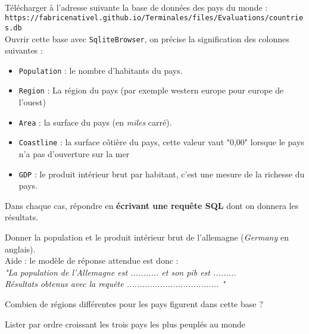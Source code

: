 \documentclass[11pt,a4paper]{article}
\begin{document}
\\
Télécharger à l'adresse suivante la base de données des pays du monde : \\
{\tt https://fabricenativel.github.io/Terminales/files/Evaluations/countries.db} \\
Ouvrir cette base avec {\tt SqliteBrowser}, on précise la signification des colonnes suivantes :
\begin{itemize}
\item {\tt Population} : le nombre d'habitants du pays.
\item {\tt Region} : La région du pays (par exemple {\sc western europe} pour europe de l'ouest)
\item {\tt Area} : la surface du pays (en \textit{miles} carré).
\item {\tt Coastline} : la surface côtière du pays, cette valeur vaut "0,00" lorsque le pays n'a pas d'ouverture sur la mer
\item {\tt GDP} : le produit intérieur brut par habitant, c'est une mesure de la richesse du pays.
\end{itemize}
\QListe
\item Dans chaque cas, répondre en \textbf{écrivant une requête SQL}  dont on donnera les résultats.
\SQListe
\item Donner la population et le produit intérieur brut de l'allemagne (\textit{Germany} en anglais).\\
\aide \; Aide : le modèle de réponse attendue est donc :\\
\textit{"La population de l'Allemagne est ........... et son {\sc pib} est ......... \\ Résultats obtenus avec la requête .................................... "}
\item Combien de régions différentes pour les pays figurent dans cette base ?
\item Lister par ordre croissant les trois pays les plus peuplés au monde
\end{document}
